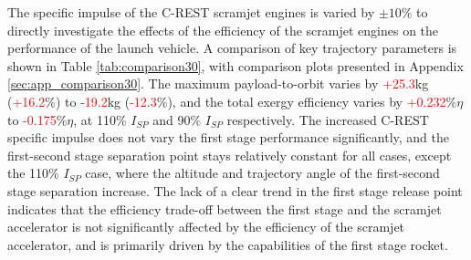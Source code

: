 The specific impulse of the C-REST scramjet engines is varied by $\pm10\%$ to directly investigate the effects of the efficiency of the scramjet engines on the performance of the launch vehicle. A comparison of key trajectory parameters is shown in Table \ref{tab:comparison30}, with comparison plots presented in Appendix \ref{sec:app_comparison30}. The maximum payload-to-orbit varies by \textcolor{red}{+25.3}kg (\textcolor{red}{+16.2}\%) to \textcolor{red}{-19.2}kg (\textcolor{red}{-12.3}\%), and the total exergy efficiency varies by \textcolor{red}{+0.232}\%$\eta$ to \textcolor{red}{-0.175}\%$\eta$, at 110\% $I_{SP}$ and 90\% $I_{SP}$ respectively. 
The increased C-REST specific impulse does not vary the first stage performance significantly, and the first-second stage separation point stays relatively constant for all cases, except the 110\% $I_{SP}$ case, where the altitude and trajectory angle of the first-second stage separation increase.   
The lack of a clear trend in the first stage release point indicates that the efficiency trade-off between the first stage and the scramjet accelerator is not significantly affected by the efficiency of the scramjet accelerator, and is primarily driven by the capabilities of the first stage rocket. 

